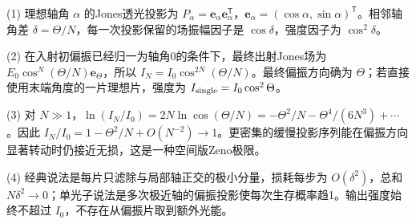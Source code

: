 (1) 理想轴角 \(\alpha\) 的Jones透光投影为 \(P_\alpha=\mathbf e_\alpha\mathbf e_\alpha^\mathsf T\)，\(\mathbf e_\alpha=(\cos\alpha,\sin\alpha)^\mathsf T\)。相邻轴角差 \(\delta=\Theta/N\)，每一次投影保留的场振幅因子是 \(\cos\delta\)，强度因子为 \(\cos^2\delta\)。

(2) 在入射初偏振已经归一为轴角0的条件下，最终出射Jones场为 \(E_0\cos^N(\Theta/N)\mathbf e_\Theta\)，所以 \(\boxed{I_N=I_0\cos^{2N}(\Theta/N)}\)。最终偏振方向确为 \(\Theta\)；若直接使用末端角度的一片理想片，强度为 \(I_{\rm single}=I_0\cos^2\Theta\)。

(3) 对 \(N\gg1\)，\(\ln(I_N/I_0)=2N\ln\cos(\Theta/N)=-\Theta^2/N-\Theta^4/(6N^3)+\cdots\)。因此 \(\boxed{I_N/I_0=1-\Theta^2/N+O(N^{-2})\to1}\)。更密集的缓慢投影序列能在偏振方向显著转动时仍接近无损，这是一种空间版Zeno极限。

(4) 经典说法是每片只滤除与局部轴正交的极小分量，损耗每步为 \(O(\delta^2)\)，总和 \(N\delta^2\to0\)；单光子说法是多次极近轴的偏振投影使每次生存概率趋1。输出强度始终不超过 \(I_0\)，不存在从偏振片取到额外光能。
